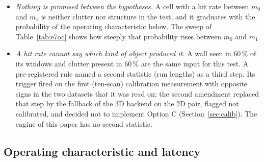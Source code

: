 \begin{itemize}
  \item \emph{Nothing is promised between the hypotheses.} A cell with a hit rate between $m_0$ and $m_1$ is neither clutter nor structure in the test, and it graduates with the probability of the operating characteristic below. The sweep of Table~\ref{tab:e7oc} shows how steeply that probability rises between $m_0$ and $m_1$.
  \item \emph{A hit rate cannot say which kind of object produced it.} A wall seen in $60\,\%$ of its windows and clutter present in $60\,\%$ are the same input for this test. A pre-registered rule named a second statistic (run lengths) as a third step. Its trigger fired on the first (ten-scan) calibration measurement with opposite signs in the two datasets that it was read on; the second amendment replaced that step by the fallback of the 3D backend on the 2D pair, flagged not calibrated, and decided not to implement Option C (Section~\ref{sec:calib}). The engine of this paper has no second statistic.
\end{itemize}



\subsection{Operating characteristic and latency}\label{subsec:oc}

